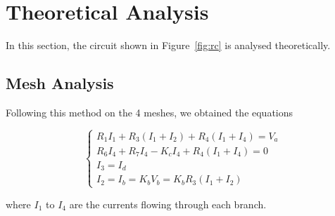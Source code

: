 \section{Theoretical Analysis}
\label{sec:analysis}

In this section, the circuit shown in Figure~\ref{fig:rc} is analysed
theoretically.

\subsection{Mesh Analysis}
Following this method on the 4 meshes, we obtained the equations

\begin{equation}
\begin{cases}
R_1 I_1 + R_3 (I_1+I_2)+R_4(I_1+I_4)=V_a\\
R_6 I_4 + R_7 I_4 -K_c I_4 + R_4 (I_1+I_4)=0\\
I_3=I_d\\
I_2=I_b=K_b V_b = K_b R_3 (I_1+I_2)
\end{cases}
\end{equation}

where $I_1$ to $I_4$ are the currents flowing through each branch. 

